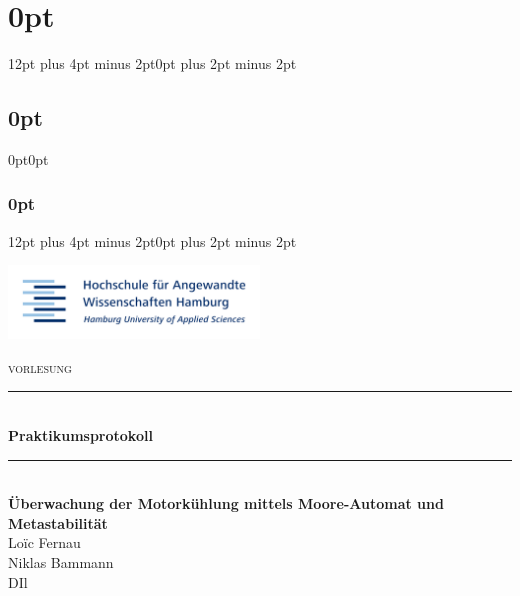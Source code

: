 
\lhead{}
\rhead{}



\usepackage{titlesec}
\titlespacing\section{0pt}{12pt plus 4pt minus 2pt}{0pt plus 2pt minus 2pt}
\titlespacing\subsection{0pt}{0pt}{0pt}
\titlespacing\subsubsection{0pt}{12pt plus 4pt minus 2pt}{0pt plus 2pt minus 2pt}




 	\begin{titlepage}
 		\begin{flushright}
			\includegraphics[width=0.5\textwidth]{img/title.png}\\[2cm]
		\end{flushright}
		
		\begin{center}
			\textsc{\Large vorlesung}
			\rule{\linewidth}{0.5mm}\\[1.5cm]
			{ \huge \bfseries Praktikumsprotokoll}
			\rule{\linewidth}{0.5mm}\\[2cm]
			{ \huge \bfseries Überwachung der Motorkühlung mittels Moore-Automat und Metastabilität}\\[2cm]

			\LARGE Loïc Fernau \\
			\LARGE Niklas Bammann \\[4cm]
			\large DIl
		\end{center}
	\end{titlepage}
	\newpage
	
	\renewcommand{\baselinestretch}{0.8}\normalsize
	\tableofcontents
	\listoffigures
	\listoftables
	\renewcommand{\baselinestretch}{1.0}\normalsize
	
	\newpage

	\setlength{\headsep}{0.4em}
	

	
	
	
	
	


	\newpage



